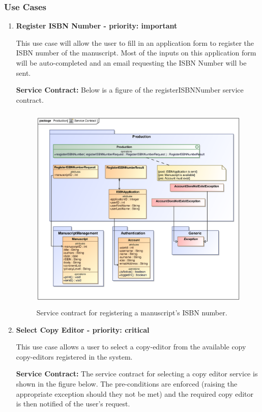 \subsubsection{Use Cases}
\begin{enumerate}
\item \textbf{Register ISBN Number - priority: important}

\par{This use case will allow the user to fill in an application form to register the ISBN number of the manuscript. Most of the inputs on this application form will be auto-completed and an email requesting the ISBN Number will be sent.}

\textbf{Service Contract:} 
Below is a figure of the registerISBNNumber service contract.

\begin{figure}[h]
\includegraphics[height=380px, width=500px]{epsImages/Production/RegisterISBNNumber.eps}
\caption{Service contract for registering a manuscript's ISBN number.}
\end{figure}

\newpage
\item \textbf{Select Copy Editor - priority: critical}\\

\par{This use case allows a user to select a copy-editor from the available copy copy-editors registered in the system.}

\textbf{Service Contract:} 
The service contract for selecting a copy editor service is shown in the figure below. The pre-conditions are enforced (raising the appropriate exception should they not be met) and the required copy editor is then notified of the user's request.


\end{enumerate}
